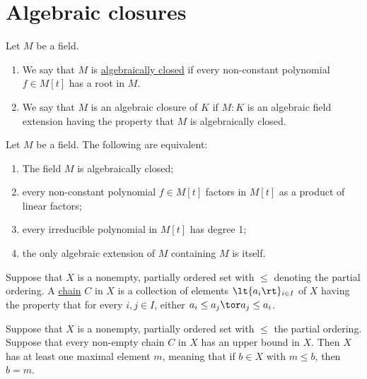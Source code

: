 \documentclass{article}
\begin{document}
\section{Algebraic closures}
  \begin{tdefinition}
    Let \( M \) be a field.
    \begin{enumerate}[label=(\roman*)]
      \item We say that \( M \) is \ul{algebraically closed} if every non-constant polynomial \( f\in M[t] \) has a root in \( M \).
      \item We say that \( M \) is an algebraic closure of \( K \) if \( M:K \) is an algebraic field extension having the property that \( M \) is algebraically closed.
    \end{enumerate}
  \end{tdefinition}

  \begin{tlemma}
    Let \( M \) be a field.
    The following are equivalent: \begin{enumerate}[label=(\roman*)]
      \item The field \( M \) is algebraically closed;
      \item every non-constant polynomial \( f\in M[t] \) factors in \( M[t] \) as a product of linear factors;
      \item every irreducible polynomial in \( M[t] \) has degree 1;
      \item the only algebraic extension of \( M \) containing \( M \) is itself.
    \end{enumerate}
  \end{tlemma}

  \begin{tdefinition}[Chain]
    Suppose that \( X \) is a nonempty, partially ordered set with \( \leq \) denoting the partial ordering.
    A \ul{chain} \( C \) in \( X \) is a collection of elements \( \lt\{ a_i \rt\}_{i\in I} \) of \( X \) having the property that for every \( i,j\in I \), either \( a_i\leq a_j \tor a_j\leq a_i \).
  \end{tdefinition}

  \quad Suppose that \( X \) is a nonempty, partially ordered set with \( \leq \) the partial ordering.
  Suppose that every non-empty chain \( C \) in \( X \) has an upper bound in \( X \).
  Then \( X \) has at least one maximal element \( m \), meaning that if \( b\in X \) with \( m\leq b \), then \( b=m \).
\end{document}
